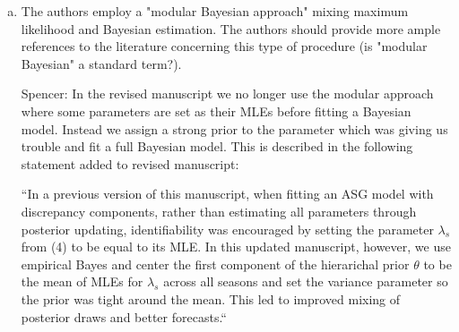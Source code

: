 \documentclass{article}
\newcommand{\spencer}[1]{{\color{blue} Spencer: #1}}
\begin{document}
\begin{enumerate}[1.]
\begin{enumerate}[a.]
% 

\item The authors employ a "modular Bayesian approach" mixing maximum likelihood and
Bayesian estimation. The authors should provide more ample references to the literature concerning
this type of procedure (is "modular Bayesian" a standard term?).

\spencer{In the revised manuscript we no longer use the modular approach
where some parameters are set as their MLEs before fitting a Bayesian 
model. Instead
we assign a strong prior to the parameter which was giving us trouble
and fit a full Bayesian model. This is
described in the following statement added to revised manuscript:

``In a previous version of this manuscript, when fitting an ASG model
with discrepancy components,
rather than estimating all parameters through posterior updating,
identifiability was encouraged by setting
the parameter $\lambda_s$ from (4)
to be equal to its MLE. In this updated manuscript, 
however, we use empirical Bayes and center the first component of the 
hierarichal prior $\theta$ to be the mean of MLEs for $\lambda_s$ across
all seasons and set the variance parameter so the prior was tight around the
mean. This led to improved mixing of posterior draws and better forecasts.``}


\end{enumerate}
\end{enumerate}
\end{document}
